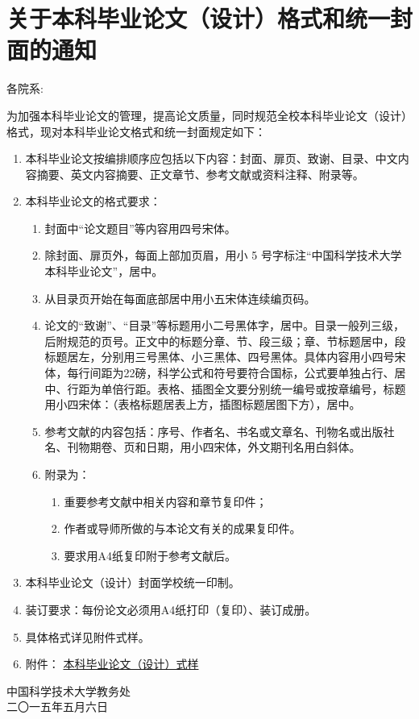 ﻿\chapter{关于本科毕业论文（设计）格式和统一封面的通知}

\noindent
各院系:

为加强本科毕业论文的管理，提高论文质量，同时规范全校本科毕业论文（设计）格式，现对本科毕业论文格式和统一封面规定如下：
\begin{enumerate}
  \item
    本科毕业论文按编排顺序应包括以下内容：封面、扉页、致谢、目录、中文内容摘要、英文内容摘要、正文章节、参考文献或资料注释、附录等。
  \item
    本科毕业论文的格式要求：
    \begin{enumerate}
      \item
        封面中“论文题目”等内容用四号宋体。
      \item
        除封面、扉页外，每面上部加页眉，用小 5 号字标注“中国科学技术大学本科毕业论文”，居中。
      \item
        从目录页开始在每面底部居中用小五宋体连续编页码。
      \item
        论文的“致谢”、“目录”等标题用小二号黑体字，居中。目录一般列三级，后附规范的页号。正文中的标题分章、节、段三级；章、节标题居中，段标题居左，分别用三号黑体、小三黑体、四号黑体。具体内容用小四号宋体，每行间距为22磅，科学公式和符号要符合国标，公式要单独占行、居中、行距为单倍行距。表格、插图全文要分别统一编号或按章编号，标题用小四宋体：（表格标题居表上方，插图标题居图下方），居中。
      \item
        参考文献的内容包括：序号、作者名、书名或文章名、刊物名或出版社名、刊物期卷、页和日期，用小四宋体，外文期刊名用白斜体。
      \item
        附录为：
        \begin{enumerate}
          \item 重要参考文献中相关内容和章节复印件；
          \item 作者或导师所做的与本论文有关的成果复印件。
          \item[] 要求用A4纸复印附于参考文献后。
        \end{enumerate}
    \end{enumerate}
  \item
    本科毕业论文（设计）封面学校统一印制。
  \item
    装订要求：每份论文必须用A4纸打印（复印）、装订成册。
  \item
    具体格式详见附件式样。
  \item[]
    附件：%
    \href{https://www.teach.ustc.edu.cn/wp-content/uploads/legacy/documents/2015/bylwgs2015f.doc} {本科毕业论文（设计）式样}
\end{enumerate}

\begin{flushright}
中国科学技术大学教务处\\
二〇一五年五月六日
\end{flushright}
